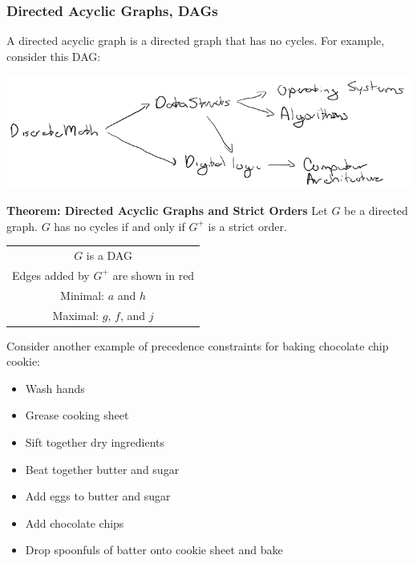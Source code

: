 \subsubsection*{Directed Acyclic Graphs, DAGs}
A directed acyclic graph is a directed graph that has no cycles. For example, consider this DAG:
\begin{center}
  \includegraphics[width=.6\linewidth]{resources/dag prereq.png}
\end{center}
\textbf{Theorem: Directed Acyclic Graphs and Strict Orders}
Let $G$ be a directed graph. $G$ has no cycles if and only if $G^+$ is a strict order.
\begin{center}
  \qquad
  \begin{tabular}{c}
    $G$ is a DAG                          \\
    Edges added by $G^+$ are shown in red \\
    Minimal: $a$ and $h$                  \\
    Maximal: $g$, $f$, and $j$
  \end{tabular}
\end{center}
Consider another example of precedence constraints for baking chocolate chip cookie:
\begin{itemize}
  \item Wash hands
  \item Grease cooking sheet
  \item Sift together dry ingredients
  \item Beat together butter and sugar
  \item Add eggs to butter and sugar
  \item Add chocolate chips
  \item Drop spoonfuls of batter onto cookie sheet and bake
\end{itemize}
